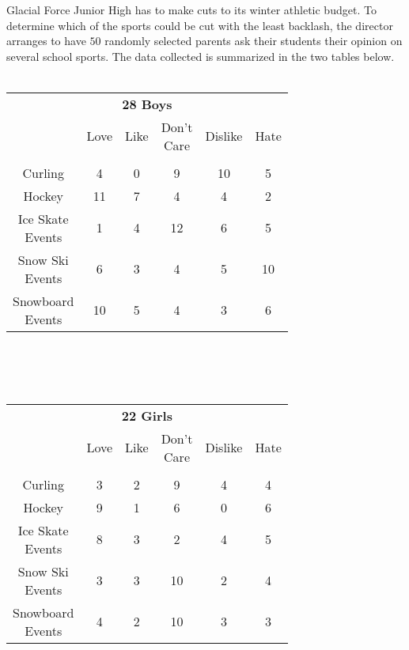  
Glacial Force Junior High has to make cuts to its winter athletic budget.  To determine which of the sports could be cut with the least backlash, the director arranges to have $50$ randomly selected parents ask their students their opinion on several school sports.  The data collected is summarized in the two tables below.\\\\
\begin{tabular}{c|c|c|c|c|c|}
  \multicolumn{6}{c}{\textbf{28 Boys}}\\
 & Love & Like & \pbox{1cm}{Don't\\Care} & Dislike & Hate \\\vspace{-3mm} &&&&&\\ \hline
Curling &4 &0 &9 &10 &5 \\ \hline
Hockey &11 &7 &4 &4 &2 \\ \hline
\pbox{2cm}{Ice Skate\\Events\\\vspace{-4mm}} \rule{0pt}{0.5cm}&1 &4 &12 &6 &5 \\ \hline
\pbox{2cm}{Snow Ski\\Events\\\vspace{-4mm}} \rule{0pt}{0.5cm}&6 &3 &4 &5 &10 \\ \hline
\pbox{2cm}{Snowboard\\Events\\\vspace{-4mm}}\rule{0pt}{0.5cm} &10 &5 &4 &3 &6 \\ \hline
\end{tabular}\\\\\\
\begin{tabular}{c|c|c|c|c|c|}
 \multicolumn{6}{c}{\textbf{22 Girls}}\\
 & Love & Like & \pbox{1cm}{Don't\\Care} & Dislike & Hate \\\vspace{-3mm} &&&&&\\ \hline
Curling &3 &2 &9 &4 &4 \\ \hline
Hockey &9 &1 &6 &0 &6 \\ \hline
\pbox{2cm}{Ice Skate\\Events\\\vspace{-4mm}} \rule{0pt}{0.5cm}&8 &3 &2 &4 &5 \\ \hline
\pbox{2cm}{Snow Ski\\Events\\\vspace{-4mm}} \rule{0pt}{0.5cm}&3 &3 &10 &2 &4 \\ \hline
\pbox{2cm}{Snowboard\\Events\\\vspace{-4mm}}\rule{0pt}{0.5cm} &4 &2 &10 &3 &3 \\ \hline
\end{tabular}

